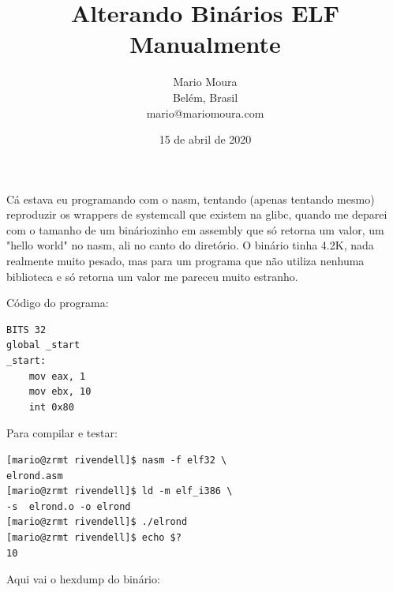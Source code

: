 \documentclass[12pt]{article}
\title{Alterando Binários ELF Manualmente\\ }
\date{15 de abril de 2020}
\author{
Mario Moura \\
Belém, Brasil \\
mario@mariomoura.com}
\begin{document}
\maketitle

Cá estava eu programando com o nasm, tentando (apenas tentando mesmo) reproduzir os wrappers de systemcall que existem na glibc, quando me deparei com o tamanho de um bináriozinho em assembly que só retorna um valor, um "hello world" no nasm, ali no canto do diretório. O binário tinha 4.2K, nada realmente muito pesado, mas para um programa que não utiliza nenhuma biblioteca e só retorna um valor me pareceu muito estranho.

Código do programa:
\begin{verbatim}
BITS 32
global _start
_start:
    mov eax, 1
    mov ebx, 10
    int 0x80
\end{verbatim}
Para compilar e testar:

\begin{verbatim}
[mario@zrmt rivendell]$ nasm -f elf32 \
elrond.asm
[mario@zrmt rivendell]$ ld -m elf_i386 \
-s  elrond.o -o elrond
[mario@zrmt rivendell]$ ./elrond
[mario@zrmt rivendell]$ echo $?
10
\end{verbatim}
Aqui vai o hexdump do binário:
\end{document}
